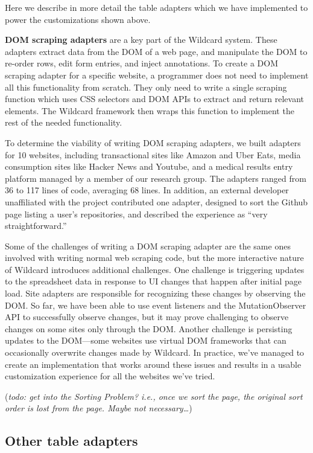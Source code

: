 \documentclass[sigplan,10pt,anonymous,review]{acmart}
\begin{document}
Here we describe in more detail the table adapters which we have
implemented to power the customizations shown above.

\textbf{DOM scraping adapters} are a key part of the Wildcard system.
These adapters extract data from the DOM of a web page, and manipulate
the DOM to re-order rows, edit form entries, and inject annotations. To
create a DOM scraping adapter for a specific website, a programmer does
not need to implement all this functionality from scratch. They only
need to write a single scraping function which uses CSS selectors and
DOM APIs to extract and return relevant elements. The Wildcard framework
then wraps this function to implement the rest of the needed
functionality.

To determine the viability of writing DOM scraping adapters, we built
adapters for 10 websites, including transactional sites like Amazon and
Uber Eats, media consumption sites like Hacker News and Youtube, and a
medical results entry platform managed by a member of our research
group. The adapters ranged from 36 to 117 lines of code, averaging 68
lines. In addition, an external developer unaffiliated with the project
contributed one adapter, designed to sort the Github page listing a
user's repositories, and described the experience as ``very
straightforward.''

Some of the challenges of writing a DOM scraping adapter are the same
ones involved with writing normal web scraping code, but the more
interactive nature of Wildcard introduces additional challenges. One
challenge is triggering updates to the spreadsheet data in response to
UI changes that happen after initial page load. Site adapters are
responsible for recognizing these changes by observing the DOM. So far,
we have been able to use event listeners and the MutationObserver API to
successfully observe changes, but it may prove challenging to observe
changes on some sites only through the DOM. Another challenge is
persisting updates to the DOM---some websites use virtual DOM frameworks
that can occasionally overwrite changes made by Wildcard. In practice,
we've managed to create an implementation that works around these issues
and results in a usable customization experience for all the websites
we've tried.

(\emph{todo: get into the Sorting Problem? i.e., once we sort the page,
the original sort order is lost from the page. Maybe not
necessary\ldots{}})

\hypertarget{other-table-adapters}{%
\subsection{Other table adapters}\label{other-table-adapters}}
\end{document}
